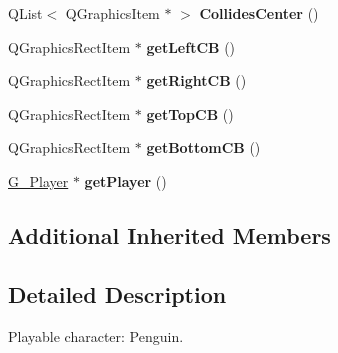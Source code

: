 \begin{DoxyCompactItemize}
\item 
\hypertarget{class_p___penguin_a1dcd291cc67f4e31b21f11777c625c34}{}Q\+List$<$ Q\+Graphics\+Item $\ast$ $>$ {\bfseries Collides\+Center} ()\label{class_p___penguin_a1dcd291cc67f4e31b21f11777c625c34}

\item 
\hypertarget{class_p___penguin_a0932c4618418db8794c5036c13b91dc4}{}Q\+Graphics\+Rect\+Item $\ast$ {\bfseries get\+Left\+C\+B} ()\label{class_p___penguin_a0932c4618418db8794c5036c13b91dc4}

\item 
\hypertarget{class_p___penguin_a32c44ca60c6fbe58ba449b6d7f263250}{}Q\+Graphics\+Rect\+Item $\ast$ {\bfseries get\+Right\+C\+B} ()\label{class_p___penguin_a32c44ca60c6fbe58ba449b6d7f263250}

\item 
\hypertarget{class_p___penguin_a1a3f91feca96abe626bf2ce39c7e5845}{}Q\+Graphics\+Rect\+Item $\ast$ {\bfseries get\+Top\+C\+B} ()\label{class_p___penguin_a1a3f91feca96abe626bf2ce39c7e5845}

\item 
\hypertarget{class_p___penguin_a8266330eda74483fd5d3d488c2c6325d}{}Q\+Graphics\+Rect\+Item $\ast$ {\bfseries get\+Bottom\+C\+B} ()\label{class_p___penguin_a8266330eda74483fd5d3d488c2c6325d}

\item 
\hypertarget{class_p___penguin_a20b08c044aab88b5a6f7530e1fe44f04}{}\hyperlink{class_g___player}{G\+\_\+\+Player} $\ast$ {\bfseries get\+Player} ()\label{class_p___penguin_a20b08c044aab88b5a6f7530e1fe44f04}

\end{DoxyCompactItemize}
\subsection*{Additional Inherited Members}


\subsection{Detailed Description}
Playable character\+: Penguin. 

